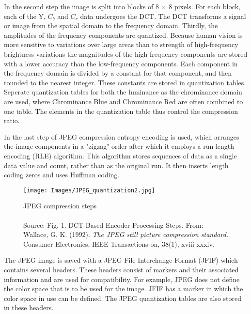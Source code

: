 In the second step the image is split into blocks of 8 $\times$ 8 pixels. For each block, each of the Y, $C_b$ and $C_r$ data undergoes the DCT. The DCT transforms a signal or image from the spatial domain to the frequency domain. Thirdly, the amplitudes of the frequency components are quantized. Because human vision is more sensitive to variations over large areas than to strength of high-frequency brightness variations the magnitudes of the high-frequency components are stored with a lower accuracy than the low-frequency components. Each component in the frequency domain is divided by a constant for that component, and then rounded to the nearest integer. These constants are stored in quantization tables. Seperate quantization tables for both the luminance as the chrominance domain are used, where Chrominance Blue and Chrominance Red are often combined to one table. The elements in the quantization table thus control the compression ratio.

In the last step of JPEG compression entropy encoding is used, which arranges the image components in a "zigzag" order after which it employs a run-length encoding (RLE) algorithm. This algorithm stores sequences of data as a single data value and count, rather than as the original run. It then inserts length coding zeros and uses Huffman coding.

\begin{figure}[h]
\centering
\texttt{[image: Images/JPEG\_quantization2.jpg]}
\captionsetup{justification=centering}

\caption{JPEG compression steps\\~\\{\small Source: Fig. 1. DCT-Based Encoder Processing Steps. From: Wallace, G. K. (1992). \textit{The JPEG still picture compression standard.} Consumer Electronics, IEEE Transactions on, 38(1), xviii-xxxiv.\cite{wallace1992jpeg}}}
\label{fig:jpeg}

\end{figure}

The JPEG image is saved with a JPEG File Interchange Format (JFIF) which contains several headers. These headers consist of markers and their associated information and are used for compatibility. For example, JPEG does not define the color space that is to be used for the image. JFIF has a marker in which the color space in use can be defined. The JPEG quantization tables are also stored in these headers.



